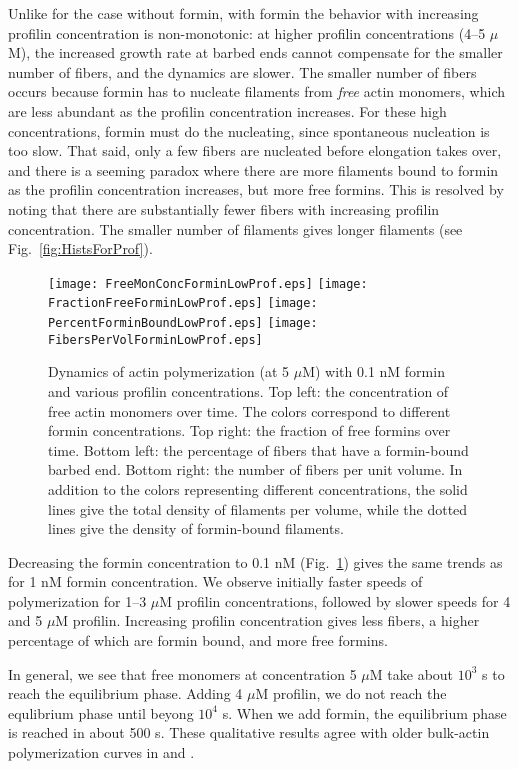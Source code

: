 \documentclass[11pt]{article}
\begin{document}
Unlike for the case without formin, with formin the behavior with increasing profilin concentration is non-monotonic: at higher profilin concentrations (4--5 $\mu$M), the increased growth rate at barbed ends cannot compensate for the smaller number of fibers, and the dynamics are slower. The smaller number of fibers occurs because formin has to nucleate filaments from \emph{free} actin monomers, which are less abundant as the profilin concentration increases. For these high concentrations, formin must do the nucleating, since spontaneous nucleation is too slow. That said, only a few fibers are nucleated before elongation takes over, and there is a seeming paradox where there are more filaments bound to formin as the profilin concentration increases, but more free formins. This is resolved by noting that there are substantially fewer fibers with increasing profilin concentration. The smaller number of filaments gives longer filaments (see Fig.\ \ref{fig:HistsForProf}).

\begin{figure}
\centering
\texttt{[image: FreeMonConcForminLowProf.eps]}
\texttt{[image: FractionFreeForminLowProf.eps]}
\texttt{[image: PercentForminBoundLowProf.eps]}
\texttt{[image: FibersPerVolForminLowProf.eps]}
\caption{\label{fig:ActinForLowProf}Dynamics of actin polymerization (at 5 $\mu$M) with 0.1 nM formin and various profilin concentrations. Top left: the concentration of free actin monomers over time. The colors correspond to different formin concentrations. Top right: the fraction of free formins over time. Bottom left: the percentage of fibers that have a formin-bound barbed end. Bottom right: the number of fibers per unit volume. In addition to the colors representing different concentrations, the solid lines give the total density of filaments per volume, while the dotted lines give the density of formin-bound filaments.}
\end{figure}

Decreasing the formin concentration to 0.1 nM (Fig.\ \ref{fig:ActinForLowProf}) gives the same trends as for 1 nM formin concentration. We observe initially faster speeds of polymerization for 1--3 $\mu$M profilin concentrations, followed by slower speeds for 4 and 5 $\mu$M profilin. Increasing profilin concentration gives less fibers, a higher percentage of which are formin bound, and more free formins. 

In general, we see that free monomers at concentration 5 $\mu$M take about $10^3$ s to reach the equilibrium phase. Adding 4 $\mu$M profilin, we do not reach the equlibrium phase until beyong $10^4$ s. When we add formin, the equilibrium phase is reached in about 500 s. These qualitative results agree with older bulk-actin polymerization curves in \cite[Fig.~2]{li2003mouse} and \cite[Fig.~6]{harris2004mouse}.
\end{document}
